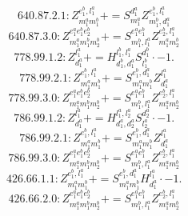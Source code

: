 \documentclass[letterpaper,10pt,fleqn,leqno,onecolumn]{article}
\begin{document}
\begin{equation} \;\;\;\;\;\;  640.87.2.1: Z^{e_{1}^{b},l_{1}^{a}}_{m_{1}^{a}m_{1}^{b}}+=S^{d_{1}^{a}}_{m_{1}^{a}}Z^{e_{1}^{b},l_{1}^{a}}_{m_{1}^{b},d_{1}^{a}} \end{equation}
\begin{equation} \;\;\;\;\;\;  640.87.3.0: Z^{e_{1}^{a}e_{1}^{b}e_{2}^{b}}_{m_{1}^{a}m_{1}^{b}m_{2}^{b}}+=S^{e_{1}^{a}e_{1}^{b}}_{m_{1}^{b},l_{1}^{a}}Z^{e_{2}^{b},l_{1}^{a}}_{m_{1}^{a}m_{2}^{b}} \end{equation}
\begin{equation} \;\;\;\;\;\;  778.99.1.2: Z^{l_{1}^{a}}_{d_{1}^{a}}+=H^{l_{1}^{b},l_{1}^{a}}_{d_{1}^{b},d_{1}^{a}}S^{d_{1}^{b}}_{l_{1}^{b}}\cdot -1. \end{equation}
\begin{equation} \;\;\;\;\;\;  778.99.2.1: Z^{e_{1}^{b},l_{1}^{a}}_{m_{1}^{a}m_{1}^{b}}+=S^{e_{1}^{b},d_{1}^{a}}_{m_{1}^{a}m_{1}^{b}}Z^{l_{1}^{a}}_{d_{1}^{a}} \end{equation}
\begin{equation} \;\;\;\;\;\;  778.99.3.0: Z^{e_{1}^{a}e_{1}^{b}e_{2}^{b}}_{m_{1}^{a}m_{1}^{b}m_{2}^{b}}+=S^{e_{1}^{a}e_{1}^{b}}_{m_{1}^{b},l_{1}^{a}}Z^{e_{2}^{b},l_{1}^{a}}_{m_{1}^{a}m_{2}^{b}} \end{equation}
\begin{equation} \;\;\;\;\;\;  786.99.1.2: Z^{l_{1}^{a}}_{d_{1}^{a}}+=H^{l_{1}^{a},l_{2}^{a}}_{d_{1}^{a},d_{2}^{a}}S^{d_{2}^{a}}_{l_{2}^{a}}\cdot -1. \end{equation}
\begin{equation} \;\;\;\;\;\;  786.99.2.1: Z^{e_{1}^{b},l_{1}^{a}}_{m_{1}^{a}m_{1}^{b}}+=S^{e_{1}^{b},d_{1}^{a}}_{m_{1}^{a}m_{1}^{b}}Z^{l_{1}^{a}}_{d_{1}^{a}} \end{equation}
\begin{equation} \;\;\;\;\;\;  786.99.3.0: Z^{e_{1}^{a}e_{1}^{b}e_{2}^{b}}_{m_{1}^{a}m_{1}^{b}m_{2}^{b}}+=S^{e_{1}^{a}e_{1}^{b}}_{m_{1}^{b},l_{1}^{a}}Z^{e_{2}^{b},l_{1}^{a}}_{m_{1}^{a}m_{2}^{b}} \end{equation}
\begin{equation} \;\;\;\;\;\;  426.66.1.1: Z^{e_{1}^{b},l_{1}^{a}}_{m_{1}^{a}m_{1}^{b}}+=S^{e_{1}^{b},d_{1}^{a}}_{m_{1}^{a}m_{1}^{b}}H^{l_{1}^{a}}_{d_{1}^{a}}\cdot -1. \end{equation}
\begin{equation} \;\;\;\;\;\;  426.66.2.0: Z^{e_{1}^{a}e_{1}^{b}e_{2}^{b}}_{m_{1}^{a}m_{1}^{b}m_{2}^{b}}+=S^{e_{1}^{a}e_{1}^{b}}_{m_{1}^{b},l_{1}^{a}}Z^{e_{2}^{b},l_{1}^{a}}_{m_{1}^{a}m_{2}^{b}} \end{equation}
\end{document}
